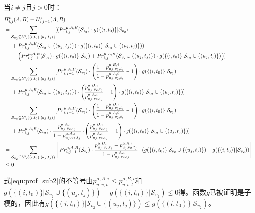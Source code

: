 当$i \ne j$且$j>0$时：
\begin{align}
\small
    &H_{i,j}^{\mu}(A,B)-H_{i,j-1}^{\mu}(A,B) \nonumber \\
    &=\sum_{\mathcal{S}_{v_2}\subseteq \mathcal{U} \setminus \{(i,t_0),(u_j,t_j)\}}[(Pr_{i,j}^{\mu,A,B}(\mathcal{S}_{v_2}) \cdot g(\{(i,t_0)\} |\mathcal{S}_{v_2})\nonumber \\
    &\ \ \ \ + Pr_{i,j}^{\mu,A,B}(\mathcal{S}_{v_2}\cup\{(u_j,t_j)\}) \cdot g(\{(i,t_0)\} |\mathcal{S}_{v_2}\cup \{(u_j,t_j)\})) \nonumber \\ 
    &\ \ \ \ -\left(Pr_{i,j-1}^{\mu,A,B}(\mathcal{S}_{v_2}) \cdot g(\{(i,t_0)\} |\mathcal{S}_{v_2})+Pr_{i,j-1}^{\mu,A,B}(\mathcal{S}_{v_2}\cup\{(u_j,t_j)\}) \cdot g(\{(i,t_0)\} |\mathcal{S}_{v_2} \cup \{(u_j,t_j)\})\right)] \\ 
    &=\sum_{\mathcal{S}_{v_2}\subseteq \mathcal{U} \setminus \{(i,t_0),(u_j,t_j)\}}[Pr_{i,j-1}^{\mu,A,B}(\mathcal{S}_{v_2})\cdot \left(\frac{1-p_{u_j,v_2,t_j}^{\mu,B,i}}{1-p_{u_j,v_2,t_j}^{\mu,A,i}} - 1\right) \cdot g(\{(i,t_0)\} |\mathcal{S}_{v_2})\nonumber\\
    &\ \ \ \ +Pr_{i,j-1}^{\mu,A,B}(\mathcal{S}_{v_2}\cup\{(u_j,t_j)\})\cdot \left(\frac{p_{u_j,v_2,t_j}^{\mu,B,i}}{p_{u_j,v_2,t_j}^{\mu,A,i}}-1\right) \cdot g(\{(i,t_0)\} |\mathcal{S}_{v_2} \cup \{(u_j,t_j)\})] \\  
    &=\sum_{\mathcal{S}_{v_2}\subseteq \mathcal{U} \setminus \{(i,t_0),(u_j,t_j)\}}[Pr_{i,j-1}^{\mu,A,B}(\mathcal{S}_{v_2})\cdot \left(\frac{1-p_{u_j,v_2,t_j}^{\mu,B,i}}{1-p_{u_j,v_2,t_j}^{\mu,A,i}} - 1\right) \cdot g(\{(i,t_0)\} |\mathcal{S}_{v_2})\nonumber\\
    &\ \ \ \ +Pr_{i,j-1}^{\mu,A,B}(\mathcal{S}_{v_2})\cdot \frac{p_{u_j,v_2,t_j}^{\mu,A,i}}{1-p_{u_j,v_2,t_j}^{\mu,A,i}} \cdot \left(\frac{p_{u_j,v_2,t_j}^{\mu,B,i}}{p_{u_j,v_2,t_j}^{\mu,A,i}}-1\right) \cdot g(\{(i,t_0)\} |\mathcal{S}_{v_2}\cup \{(u_j,t_j)\})] \\
    &= \sum_{\mathcal{S}_{v_2}\subseteq \mathcal{U} \setminus \{(i,t_0),(u_j,t_j)\}}\left[Pr_{i,j-1}^{\mu,A,B}(\mathcal{S}_{v_2})\cdot \frac{p_{u_j,v_2,t_j}^{\mu,B,i}-p_{u_j,v_2,t_j}^{\mu,A,i}}{1-p_{u_j,v_2,t_j}^{\mu,A,i}} \cdot (g(\{(i,t_0)\} |\mathcal{S}_{v_2} \cup \{(u_j,t_j)\})-g(\{(i,t_0)\} |\mathcal{S}_{v_2}))\right] \\
    &\le 0 \label{equ:prof_sub2}
\end{align}

式\ref{equ:prof_sub2}的不等号由$p_{u,v,t}^{\mu,A,i} \le p_{u,v,t}^{\mu,B,i}$和$g(\{(i,t_0)\} |\mathcal{S}_{v_2} \cup \{(u_j,t_j)\})-g(\{(i,t_0)\} |\mathcal{S}_{v_2}) \le 0$得。函数$g$已被证明是子模的\cite{mrim}，因此有$g(\{(i,t_0)\} |\mathcal{S}_{v_2} \cup \{(u_j,t_j)\})\le g(\{(i,t_0)\} |\mathcal{S}_{v_2}) $。

